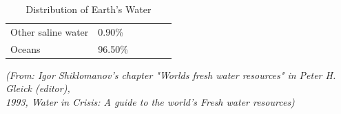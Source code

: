\documentclass{article}
\begin{document}
\begin{table}[ht]
\begin{center}
\begin{tabular}{|l|l|llll}
Other saline   water         & 0.90\%                  &                                                     &                                              &                                                &                              \\ \cline{1-2}
Oceans                       & 96.50\%                 &                                                     &                                              &                                                &                              \\ \cline{1-2}
\end{tabular}
\caption{Distribution of Earth's Water}
\textit{(From:  Igor Shiklomanov's chapter "Worlds fresh water resources" in Peter H. Gleick (editor), \\1993, Water in Crisis: A guide to the world's Fresh water resources)}
\end{center}
\end{table}     

\newpage
\end{document}
